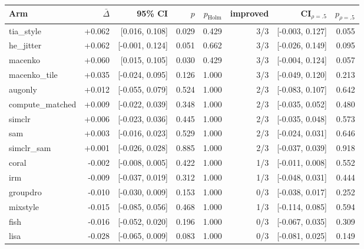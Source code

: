 \begin{tabular}{lrrrrrrr}
\toprule
Arm & $\bar\Delta$ & 95\% CI & $p$ & $p_\text{Holm}$ & improved & CI$_{\rho=.5}$ & $p_{\rho=.5}$ \\
\midrule
tia\_style & +0.062 & [0.016, 0.108] & 0.029 & 0.429 & 3/3 & [-0.003, 0.127] & 0.055 \\
he\_jitter & +0.062 & [-0.001, 0.124] & 0.051 & 0.662 & 3/3 & [-0.026, 0.149] & 0.095 \\
macenko & +0.060 & [0.015, 0.105] & 0.030 & 0.429 & 3/3 & [-0.004, 0.124] & 0.057 \\
macenko\_tile & +0.035 & [-0.024, 0.095] & 0.126 & 1.000 & 3/3 & [-0.049, 0.120] & 0.213 \\
augonly & +0.012 & [-0.055, 0.079] & 0.524 & 1.000 & 2/3 & [-0.083, 0.107] & 0.642 \\
compute\_matched & +0.009 & [-0.022, 0.039] & 0.348 & 1.000 & 2/3 & [-0.035, 0.052] & 0.480 \\
simclr & +0.006 & [-0.023, 0.036] & 0.445 & 1.000 & 2/3 & [-0.035, 0.048] & 0.573 \\
sam & +0.003 & [-0.016, 0.023] & 0.529 & 1.000 & 2/3 & [-0.024, 0.031] & 0.646 \\
simclr\_sam & +0.001 & [-0.026, 0.028] & 0.885 & 1.000 & 2/3 & [-0.037, 0.039] & 0.918 \\
coral & -0.002 & [-0.008, 0.005] & 0.422 & 1.000 & 1/3 & [-0.011, 0.008] & 0.552 \\
irm & -0.009 & [-0.037, 0.019] & 0.312 & 1.000 & 1/3 & [-0.048, 0.031] & 0.444 \\
groupdro & -0.010 & [-0.030, 0.009] & 0.153 & 1.000 & 0/3 & [-0.038, 0.017] & 0.252 \\
mixstyle & -0.015 & [-0.085, 0.056] & 0.468 & 1.000 & 1/3 & [-0.114, 0.085] & 0.594 \\
fish & -0.016 & [-0.052, 0.020] & 0.196 & 1.000 & 0/3 & [-0.067, 0.035] & 0.309 \\
lisa & -0.028 & [-0.065, 0.009] & 0.083 & 1.000 & 0/3 & [-0.081, 0.025] & 0.149 \\
\bottomrule
\end{tabular}
